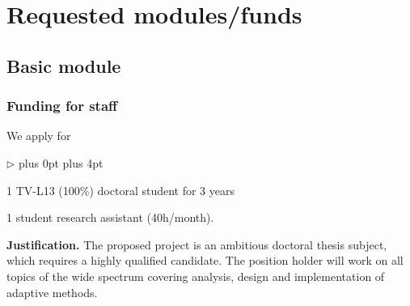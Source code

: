 \documentclass[enabledeprecatedfontcommands,cleardoublepage=empty,headsepline,twoside,11pt,DIV=15,BCOR=12mm,final]{scrartcl}
\renewenvironment{itemize}
{\begin{list}{$\triangleright$}{\labelwidth-2mm \leftmargin3mm %
  \itemsep5pt plus 0pt  \topsep3pt \parsep1pt plus 4pt \labelsep2mm}}
{\end{list}}
\begin{document}
%

\section{Requested modules/funds}
\label{sec:moduls}

\subsection{Basic module}

\subsubsection{Funding for staff}

We apply for
\begin{itemize}\itemsep=0pt
\item 1 TV-L13 (100\%) doctoral student for 3 years 
\item 1 student research assistant (40h/month).
\end{itemize}
\textbf{Justification.} 
The proposed project is an ambitious doctoral thesis subject, which requires a
highly qualified candidate. The position holder will work on all topics
of the wide spectrum covering analysis, design and implementation of adaptive methods. %
\end{document}
